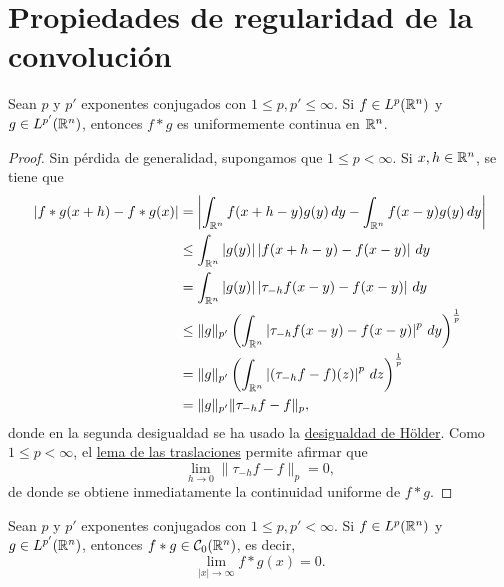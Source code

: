 \documentclass[a4paper, 11pt, oneside]{report}
\begin{document}
\section{Propiedades de regularidad de la convolución}

\begin{theorem}\label{teo:2.2.1}
  Sean $p$ y $p'$ exponentes conjugados con $1 \leq p,p' \leq \infty$. Si $f \in L^p(\mathbb R^n)$ y $g \in L^{p'}(\mathbb R^n)$, entonces $f \ast g$ es uniformemente continua en $\mathbb R^n$.
\end{theorem}

\begin{proof}
  Sin pérdida de generalidad, supongamos que $1 \leq p < \infty$. Si $x,h \in \mathbb R^n$, se tiene que
  \[\begin{aligned}[t]
    |f\ast g(x+h) - f\ast g(x) | &= \left|\int_{\mathbb R^n} f(x+h-y)g(y) \, dy - \int_{\mathbb R^n}f(x-y)g(y) \, dy\right| \\
    &\leq \int_{\mathbb R^n} |g(y)|\left|f(x+h-y)-f(x-y)\right| \, dy \\
    &= \int_{\mathbb R^n} |g(y)| \left|\tau_{-h}f(x-y) - f(x-y)\right| \, dy \\
    &\leq \|g\|_{p'} \left(\int_{\mathbb R^n} \left|\tau_{-h}f(x-y) - f(x-y)\right|^p \, dy\right)^{\frac{1}{p}} \\
    &= \|g\|_{p'} \left(\int_{\mathbb R^n} \left|(\tau_{-h}f- f)(z)\right|^p \, dz\right)^{\frac{1}{p}} \\
    &= \|g\|_{p'} \|\tau_{-h}f - f\|_p,
  \end{aligned}\]
  donde en la segunda desigualdad se ha usado la \hyperref[cor:1.4.4]{\color{c1}desigualdad de Hölder}. Como $1 \leq p < \infty$, el \hyperref[teo:1.11.2]{\color{c1}lema de las traslaciones} permite afirmar que
  \[\lim_{h \to 0} \|\tau_{-h}f - f\|_p = 0,\]
  de donde se obtiene inmediatamente la continuidad uniforme de $f \ast g$.
\end{proof}

\begin{theorem}
  Sean $p$ y $p'$ exponentes conjugados con $1 \leq p,p' < \infty$. Si $f \in L^p(\mathbb R^n)$ y $g \in L^{p'}(\mathbb R^n)$, entonces $f \ast g \in \mathcal{C}_0(\mathbb R^n)$, es decir,
  \[\lim_{|x| \to \infty} f \ast g (x) = 0.\]
\end{theorem}
\end{document}
